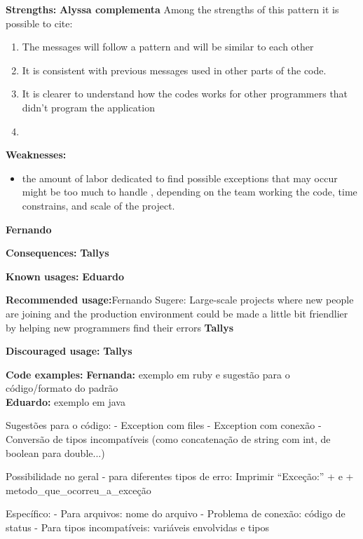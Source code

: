 \documentclass[12pt]{article}
\begin{document}
\begin{flushleft}
\textbf{Strengths:}  \textbf{Alyssa complementa}
Among the strengths of this pattern it is possible to cite:
\begin{enumerate}
\item The messages will follow a pattern and will be similar to each other

\item It is consistent with previous messages used in other parts of the code.  

\item It is clearer to understand how the codes works for other programmers that didn’t program the application

\item 



\end{enumerate}



\textbf{Weaknesses:}
\begin{itemize}
\item the amount of labor dedicated to find possible exceptions that may occur might be too much to handle , depending on the team working the code, time constrains, and scale of the project.
\end{itemize}\textbf{Fernando}\newline 


\textbf{Consequences:}\newline
\textbf{Tallys}


\textbf{Known usages:}\newline
\textbf{Eduardo}

\textbf{Recommended usage:}Fernando Sugere: Large-scale projects where new people are joining and the production environment could be made a little bit friendlier by helping new programmers find their errors\newline
\textbf{Tallys}

\textbf{Discouraged usage:}\newline
\textbf{Tallys}



\textbf{Code examples:}
\textbf{ Fernanda:} exemplo em ruby e sugestão para o código/formato do padrão\\
\textbf{ Eduardo:} exemplo em java
 
 
 Sugestões para o código:
 - Exception com files
 - Exception com conexão
 - Conversão de tipos incompatíveis (como concatenação de string com int, de boolean para double...)
 
 Possibilidade no geral - para diferentes tipos de erro:
 Imprimir ``Exceção:'' + e + metodo\_que\_ocorreu\_a\_exceção
 
 Específico:
 - Para arquivos: nome do arquivo
 - Problema de conexão: código de status
 - Para tipos incompatíveis: variáveis envolvidas e tipos
 
 
 
 
 
 \end{flushleft}
\end{document}
